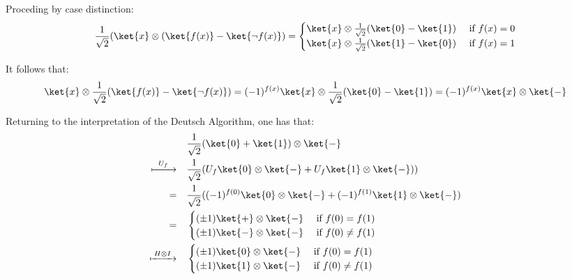   Proceding by case distinction:
  \begin{equation}
    \frac{1}{\sqrt{2}}(\ket{x} \otimes (\ket{f(x)}-\ket{\neg f(x)}) = 
    \begin{cases}
      \ket{x} \otimes \frac{1}{\sqrt{2}}(\ket{0}-\ket{1}) &\text{ if } f(x)=0    \\
      \ket{x} \otimes \frac{1}{\sqrt{2}}(\ket{1}-\ket{0}) &\text{ if }   f(x)= 1 
    \end{cases}
  \end{equation}
  
 It follows that:
  \begin{equation}
   \ket{x} \otimes  \frac{1}{\sqrt{2}}(\ket{f(x)}-\ket{\neg f(x)}) = (-1)^{f(x)} \ket{x} \otimes \frac{1}{\sqrt{2}}(\ket{0}-\ket{1}) = (-1)^{f(x)} \ket{x} \otimes \ket{-}
  \end{equation}
  
  Returning to the interpretation of the Deutsch Algorithm, one has that:
  \begin{equation}
  \begin{split}
    \quad & \frac{1}{\sqrt{2}}(\ket{0} + \ket{1}) \otimes \ket{-}\\
    \xmapsto{ \hspace{5 pt} U_{f} \hspace{5pt}} \quad & \frac{1}{\sqrt{2}}( U_{f} \ket{0} \otimes \ket{-} + U_{f} \ket{1} \otimes \ket{-})) \\
    = \quad & \frac{1}{\sqrt{2}}( (-1)^{f(0)} \ket{0} \otimes \ket{-} + (-1)^{f(1)} \ket{1} \otimes \ket{-}) \\
    = \quad &
    \begin{cases}
      (\pm 1) \ket{+} \otimes \ket{-} &\text{ if }   f(0)= f(1) \\
      (\pm 1) \ket{-} \otimes \ket{-} &\text{ if }   f(0) \neq f(1)
    \end{cases} \\
    \xmapsto{ \hspace{2pt} H \otimes I \hspace{2pt}} \quad & 
    \begin{cases}
      (\pm 1) \ket{0} \otimes \ket{-} &\text{ if }   f(0)= f(1) \\
      (\pm 1) \ket{1} \otimes \ket{-} &\text{ if }   f(0) \neq f(1)\\
    \end{cases} \\
  \end {split}
  \end{equation} 

